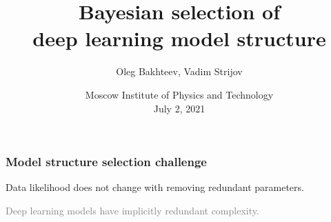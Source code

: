 \documentclass[usenames,dvipsnames,11pt,pdf,utf8,russian,aspectratio=169]{beamer}
\title[Model structure selection]{Bayesian selection of \\deep learning model structure}
\author{Oleg Bakhteev, Vadim Strijov}
\date[2021]{Moscow Institute of Physics and Technology\\July 2, 2021}
\begin{document}

\begin{frame}
  \titlepage
\end{frame}





\begin{frame}    
                                                                                                                        
\frametitle{Model structure selection challenge}     
Data likelihood does not change with removing redundant parameters.
\begin{figure}[h]                                                                                                                               
\centering                                                                                                                                      
\hspace*{-1cm}                                       
\end{figure}                                                                                                   
\textcolor{gray}{Deep learning models have implicitly redundant complexity.}  

                                                                                                                                             
\end{frame}    
\end{document}
